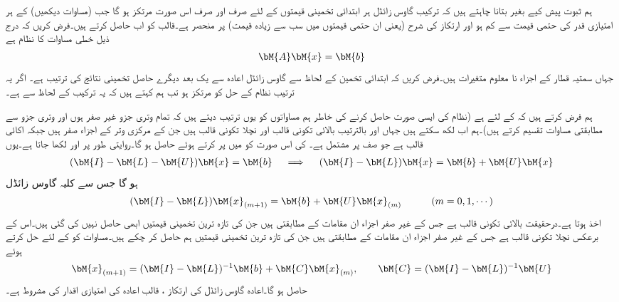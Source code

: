 ہم ثبوت پیش کیے بغیر بتانا چاہتے ہیں کہ ترکیب گاوس زائڈل  ہر ابتدائی تخمینی قیمتوں کے لئے صرف اور صرف اس صورت مرتکز ہو گا جب    (مساوات  دیکھیں) کے ہر امتیازی قدر کی  حتمی قیمت  سے کم ہو اور ارتکاز کی شرح   (یعنی ان حتمی قیمتوں میں سب سے زیادہ قیمت) پر منحصر ہے۔قالب  کو اب حاصل کرتے ہیں۔فرض کریں کہ درج ذیل  خطی مساوات کا نظام ہے
\begin{align*}
\bM{A}\bM{x}=\bM{b}
\end{align*}
جہاں سمتیہ قطار    کے اجزاء نا معلوم متغیرات  ہیں۔فرض کریں کہ ابتدائی تخمین  کے لحاظ سے
  گاوس زائڈل اعادہ سے یک بعد دیگرے حاصل تخمینی نتائج کی ترتیب ہے۔ اگر یہ ترتیب نظام کے حل کو مرتکز ہو تب ہم کہتے ہیں کہ یہ ترکیب    کے لحاظ سے  ہے۔

ہم فرض کرتے ہیں کہ  کے لئے  ہے (نظام کی ایسی صورت حاصل کرنے کی خاطر ہم مساواتوں کو یوں ترتیب دیتے ہیں کہ تمام وتری جزو غیر صفر ہوں اور وتری جزو سے مطابقتی مساوات  تقسیم کرتے ہیں)۔ہم اب  لکھ سکتے ہیں جہاں  اور  بالترتیب بالائی تکونی قالب اور نچلا تکونی قالب ہیں جن کے مرکزی وتر کے اجزاء صفر ہیں جبکہ   اکائی قالب ہے جو  صف پر مشتمل ہے۔ کی اس صورت کو  میں پر کرتے ہوئے  حاصل ہو گا۔روایتی طور پر  اور  لکھا جاتا ہے۔یوں
\begin{align*}
(\bM{I}-\bM{L}-\bM{U})\bM{x}=\bM{b}\quad \implies \quad (\bM{I}-\bM{L})\bM{x}=\bM{b}+\bM{U}\bM{x}
\end{align*}
ہو گا جس سے کلیہ گاوس زائڈل
\begin{align}\label{مساوات_خطی_اعدادی_مثال_ت}
(\bM{I}-\bM{L})\bM{x}_{(m+1)}=\bM{b}+\bM{U}\bM{x}_{(m)}\quad \quad \quad (m=0,1,\cdots)
\end{align}
اخذ ہوتا ہے۔درحقیقت  بالائی تکونی قالب ہے جس کے غیر صفر اجزاء ان مقامات کے مطابقتی ہیں جن کی تازہ ترین تخمینی قیمتیں ابھی حاصل نہیں کی گئی ہیں۔اس کے برعکس  نچلا تکونی قالب ہے جس کے غیر صفر اجزاء ان مقامات کے مطابقتی ہیں جن کی تازہ ترین تخمینی قیمتیں  ہم حاصل کر چکے ہیں۔مساوات  کو  کے لئے حل کرتے ہوئے
\begin{align}\label{مساوات_خطی_اعدادی_مثال_ٹ}
\bM{x}_{(m+1)}=(\bM{I}-\bM{L})^{-1}\bM{b}+\bM{C}\bM{x}_{(m)},\quad \quad \bM{C}=(\bM{I}-\bM{L})^{-1}\bM{U}
\end{align}
حاصل ہو گا۔اعادہ گاوس زائڈل  کی ارتکاز ، قالب اعادہ  کی امتیازی اقدار کی مشروط ہے۔

